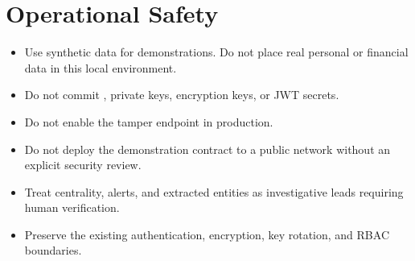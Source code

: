 \documentclass[11pt,a4paper]{article}
\newcommand{\pathcode}[1]{\texttt{\detokenize{#1}}}
\begin{document}
\section{Operational Safety}

\begin{itemize}[leftmargin=*]
  \item Use synthetic data for demonstrations. Do not place real personal or financial data in this local environment.
  \item Do not commit \pathcode{backend/.env}, private keys, encryption keys, or JWT secrets.
  \item Do not enable the tamper endpoint in production.
  \item Do not deploy the demonstration contract to a public network without an explicit security review.
  \item Treat centrality, alerts, and extracted entities as investigative leads requiring human verification.
  \item Preserve the existing authentication, encryption, key rotation, and RBAC boundaries.
\end{itemize}
\end{document}
